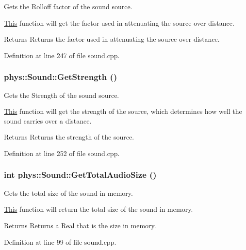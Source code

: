 Gets the Rolloff factor of the sound source. 

\hyperlink{structThis}{This} function will get the factor used in attenuating the source over distance. \begin{DoxyReturn}{Returns}
Returns the factor used in attenuating the source over distance. 
\end{DoxyReturn}


Definition at line 247 of file sound.cpp.

\hypertarget{classphys_1_1Sound_ab839e69523500591b40252e32bafbbb3}{
\subsubsection[{GetStrength}]{ phys::Sound::GetStrength ()}}
\label{dc/d2f/classphys_1_1Sound_ab839e69523500591b40252e32bafbbb3}


Gets the Strength of the sound source. 

\hyperlink{structThis}{This} function will get the strength of the source, which determines how well the sound carries over a distance. \begin{DoxyReturn}{Returns}
Returns the strength of the source. 
\end{DoxyReturn}


Definition at line 252 of file sound.cpp.

\hypertarget{classphys_1_1Sound_a2891732590e4276a64583ee9bdab555e}{
\subsubsection[{GetTotalAudioSize}]{\setlength{\rightskip}{0pt plus 5cm}int phys::Sound::GetTotalAudioSize ()}}
\label{dc/d2f/classphys_1_1Sound_a2891732590e4276a64583ee9bdab555e}


Gets the total size of the sound in memory. 

\hyperlink{structThis}{This} function will return the total size of the sound in memory. \begin{DoxyReturn}{Returns}
Returns a Real that is the size in memory. 
\end{DoxyReturn}


Definition at line 99 of file sound.cpp.

